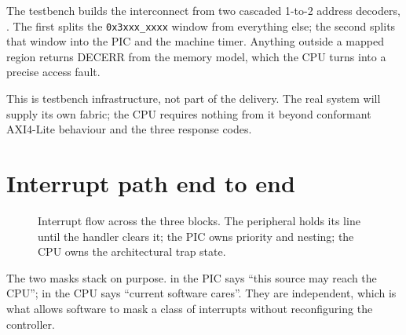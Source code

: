 \begin{sloppypar}
The testbench builds the interconnect from two cascaded 1-to-2 address decoders,
. The first splits the \texttt{0x3xxx\_xxxx} window from
everything else; the second splits that window into the PIC and the machine
timer. Anything outside a mapped region returns DECERR from the memory model,
which the CPU turns into a precise access fault.
\end{sloppypar}

This is testbench infrastructure, not part of the delivery. The real system will
supply its own fabric; the CPU requires nothing from it beyond conformant
AXI4-Lite behaviour and the three response codes.

\section{Interrupt path end to end}

\begin{figure}[H]
\centering
{}
\caption{Interrupt flow across the three blocks. The peripheral holds its line
until the handler clears it; the PIC owns priority and nesting; the CPU owns the
architectural trap state.}
\label{fig:irqflow}
\end{figure}

The two masks stack on purpose.  in the PIC says ``this source
may reach the CPU'';  in the CPU says ``current software cares''. They
are independent, which is what allows software to mask a class of interrupts
without reconfiguring the controller.

